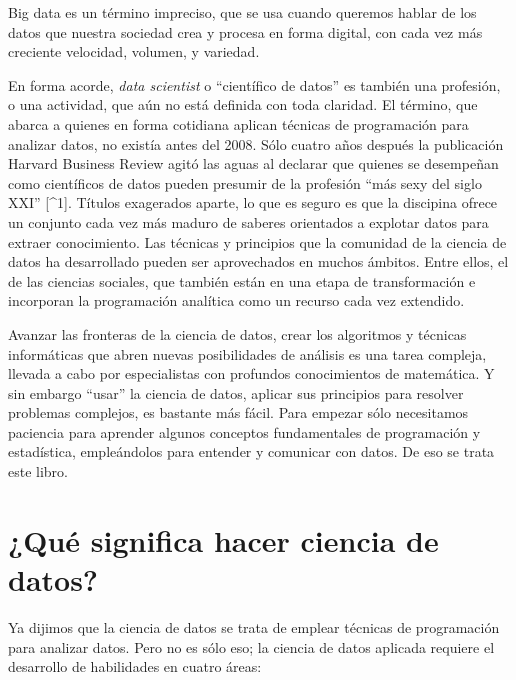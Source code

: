 \documentclass[]{book}
\begin{document}
Big data es un término impreciso, que se usa cuando queremos hablar de
los datos que nuestra sociedad crea y procesa en forma digital, con cada
vez más creciente velocidad, volumen, y variedad.

En forma acorde, \emph{data scientist} o ``científico de datos'' es
también una profesión, o una actividad, que aún no está definida con
toda claridad. El término, que abarca a quienes en forma cotidiana
aplican técnicas de programación para analizar datos, no existía antes
del 2008. Sólo cuatro años después la publicación Harvard Business
Review agitó las aguas al declarar que quienes se desempeñan como
científicos de datos pueden presumir de la profesión ``más sexy del
siglo XXI'' {[}\^{}1{]}. Títulos exagerados aparte, lo que es seguro es
que la discipina ofrece un conjunto cada vez más maduro de saberes
orientados a explotar datos para extraer conocimiento. Las técnicas y
principios que la comunidad de la ciencia de datos ha desarrollado
pueden ser aprovechados en muchos ámbitos. Entre ellos, el de las
ciencias sociales, que también están en una etapa de transformación e
incorporan la programación analítica como un recurso cada vez extendido.

Avanzar las fronteras de la ciencia de datos, crear los algoritmos y
técnicas informáticas que abren nuevas posibilidades de análisis es una
tarea compleja, llevada a cabo por especialistas con profundos
conocimientos de matemática. Y sin embargo ``usar'' la ciencia de datos,
aplicar sus principios para resolver problemas complejos, es bastante
más fácil. Para empezar sólo necesitamos paciencia para aprender algunos
conceptos fundamentales de programación y estadística, empleándolos para
entender y comunicar con datos. De eso se trata este libro.

\section{¿Qué significa hacer ciencia de
datos?}\label{que-significa-hacer-ciencia-de-datos}

Ya dijimos que la ciencia de datos se trata de emplear técnicas de
programación para analizar datos. Pero no es sólo eso; la ciencia de
datos aplicada requiere el desarrollo de habilidades en cuatro áreas:
\end{document}
